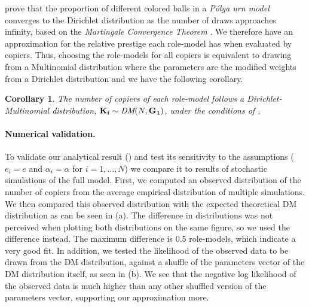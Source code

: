 \documentclass[12pt]{extarticle}
\let\vec\mathbf
\newtheorem{corollary}{Corollary}
\begin{document}
\citet[section 2]{dirichlet} prove that the proportion of different colored balls in a \emph{P\'{o}lya urn model} converges to the Dirichlet distribution as the number of draws approaches infinity, based on the \emph{Martingale Convergence Theorem} \citep{martingaleBook}.
We therefore have an approximation for the relative prestige each role-model has when evaluated by copiers. Thus, choosing the role-models for all copiers is equivalent to drawing from a Multinomial distribution where the parameters are the modified weights from a Dirichlet distribution and we have the following corollary.
\\

\begin{corollary}\label{cor:dirichlet}
The number of copiers of each role-model follows a Dirichlet-Multinomial distribution, $\vec{K_i} \sim \emph{DM}(N,\vec{G_1})$, under the conditions of .
\end{corollary}

\paragraph{Numerical validation.}
To validate our analytical result () and test its sensitivity to the assumptions ($e_i=e$ and $\alpha_i=\alpha$ for $i=1,\ldots,N$) we compare it to results of stochastic simulations of the full model.
First, we computed an observed distribution of the number of copiers from the average empirical distribution of multiple simulations.
We then compared this observed distribution with the expected theoretical DM distribution as can be seen in  (a). The difference in distributions was not perceived when plotting both distributions on the same figure, so we used the difference instead. The maximum difference is 0.5 role-models, which indicate a very good fit.
In addition, we tested the likelihood of the observed data to be drawn from the DM distribution, against a shuffle of the parameters vector of the DM distribution itself, as seen in  (b). We see that the negative log likelihood of the observed data is much higher than any other shuffled version of the parameters vector, supporting our approximation more.
\end{document}
